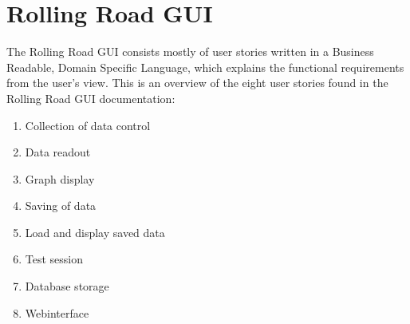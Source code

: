 \section{Rolling Road GUI}
The Rolling Road GUI consists mostly of user stories written in a Business Readable, Domain Specific Language, which explains the functional requirements from the user's view.
This is an overview of the eight user stories found in the Rolling Road GUI documentation:

\begin{enumerate}[US1:]
	\item Collection of data control
	\item Data readout
	\item Graph display
	\item Saving of data
	\item Load and display saved data
	\item Test session
	\item Database storage
	\item Webinterface
\end{enumerate}